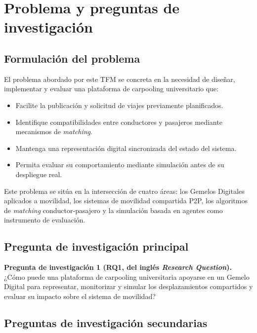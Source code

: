 
\chapter{Problema y preguntas de investigación}
\label{ch:problema}

\section{Formulación del problema}

El problema abordado por este TFM se concreta en la necesidad de diseñar, implementar y evaluar una plataforma de carpooling universitario que:
\begin{itemize}
    \item Facilite la publicación y solicitud de viajes previamente planificados.
    \item Identifique compatibilidades entre conductores y pasajeros mediante mecanismos de \textit{matching}.
    \item Mantenga una representación digital sincronizada del estado del sistema.
    \item Permita evaluar su comportamiento mediante simulación antes de su despliegue real.
\end{itemize}

Este problema se sitúa en la intersección de cuatro áreas: los Gemelos Digitales aplicados a movilidad, los sistemas de movilidad compartida P2P, los algoritmos de \textit{matching} conductor-pasajero y la simulación basada en agentes como instrumento de evaluación.

\section{Pregunta de investigación principal}

\textbf{Pregunta de investigación 1 (RQ1, del inglés \textit{Research Question}).} ¿Cómo puede una plataforma de carpooling universitaria apoyarse en un Gemelo Digital para representar, monitorizar y simular los desplazamientos compartidos y evaluar su impacto sobre el sistema de movilidad?

\section{Preguntas de investigación secundarias}

